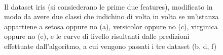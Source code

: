 \documentclass[oneside, openany]{book}
\begin{document}
\begin{figure}
		\quad 
		\\
		\caption{Il dataset iris (si consiederano le prime due features), modificato in modo da avere due classi che indichino di volta in volta se un'istanza appartiene a setosa oppure no (a), versicolor oppure no (c), virginica oppure no (e), e le curve di livello risultanti dalle predizioni effettuate dall'algoritmo, a cui vengono passati i tre dataset (b, d, f)}
		\label{fig:vis}
	\end{figure}
\end{document}
